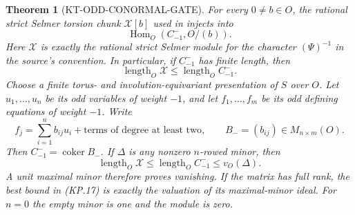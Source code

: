 \documentclass[11pt,a4paper]{article}
\newtheorem{theorem}{Theorem}[section]
\theoremstyle{definition}
\begin{document}
\begin{theorem}[KT-ODD-CONORMAL-GATE]
For every $0\ne b\in O$, the rational strict Selmer torsion
chunk $\mathcal X[b]$ used in  injects into
\[
               \operatorname{Hom}_O(C^-_{-1},O/(b)).         \tag{KP.14}
\]
Here $\mathcal X$ is exactly the rational strict Selmer module
for the character $(\Psi)^{-1}$ in the source's convention.
In particular, if $C^-_{-1}$ has finite length, then
\[
           \operatorname{length}_O\mathcal X
                   \leq\operatorname{length}_O C^-_{-1}.    \tag{KP.15}
\]
Choose a finite torus- and involution-equivariant presentation
of $S$ over $O$.  Let $u_1,\ldots,u_n$ be its odd variables of
weight $-1$, and let $f_1,\ldots,f_m$ be its odd defining
equations of weight $-1$.  Write
\[
 f_j=\sum_{i=1}^n b_{ij}u_i+\text{terms of degree at least two},
       \qquad B_-=(b_{ij})\in M_{n\times m}(O).              \tag{KP.16}
\]
Then $C^-_{-1}=\operatorname{coker} B_-$.  If $\Delta$ is any
nonzero $n$-rowed minor, then
\[
       \operatorname{length}_O\mathcal X
                  \leq\operatorname{length}_O C^-_{-1}
                  \leq v_O(\Delta).                         \tag{KP.17}
\]
A unit maximal minor therefore proves vanishing.  If the
matrix has full rank, the best bound in (KP.17) is exactly
the valuation of its maximal-minor ideal.  For $n=0$ the
empty minor is one and the module is zero.
\end{theorem}
\end{document}
